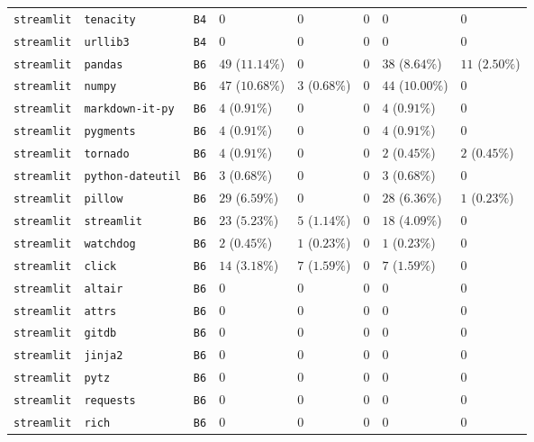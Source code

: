 \begin{table}
\begin{tabular}{llllllll}
\texttt{streamlit} & \texttt{tenacity} & \texttt{B4} & $0$ & $0$ & $0$ & $0$ & $0$ \\
\texttt{streamlit} & \texttt{urllib3} & \texttt{B4} & $0$ & $0$ & $0$ & $0$ & $0$ \\
\texttt{streamlit} & \texttt{pandas} & \texttt{B6} & $49$ ($11.14\%$) & $0$ & $0$ & $38$ ($8.64\%$) & $11$ ($2.50\%$) \\
\texttt{streamlit} & \texttt{numpy} & \texttt{B6} & $47$ ($10.68\%$) & $3$ ($0.68\%$) & $0$ & $44$ ($10.00\%$) & $0$ \\
\texttt{streamlit} & \texttt{markdown-it-py} & \texttt{B6} & $4$ ($0.91\%$) & $0$ & $0$ & $4$ ($0.91\%$) & $0$ \\
\texttt{streamlit} & \texttt{pygments} & \texttt{B6} & $4$ ($0.91\%$) & $0$ & $0$ & $4$ ($0.91\%$) & $0$ \\
\texttt{streamlit} & \texttt{tornado} & \texttt{B6} & $4$ ($0.91\%$) & $0$ & $0$ & $2$ ($0.45\%$) & $2$ ($0.45\%$) \\
\texttt{streamlit} & \texttt{python-dateutil} & \texttt{B6} & $3$ ($0.68\%$) & $0$ & $0$ & $3$ ($0.68\%$) & $0$ \\
\texttt{streamlit} & \texttt{pillow} & \texttt{B6} & $29$ ($6.59\%$) & $0$ & $0$ & $28$ ($6.36\%$) & $1$ ($0.23\%$) \\
\texttt{streamlit} & \texttt{streamlit} & \texttt{B6} & $23$ ($5.23\%$) & $5$ ($1.14\%$) & $0$ & $18$ ($4.09\%$) & $0$ \\
\texttt{streamlit} & \texttt{watchdog} & \texttt{B6} & $2$ ($0.45\%$) & $1$ ($0.23\%$) & $0$ & $1$ ($0.23\%$) & $0$ \\
\texttt{streamlit} & \texttt{click} & \texttt{B6} & $14$ ($3.18\%$) & $7$ ($1.59\%$) & $0$ & $7$ ($1.59\%$) & $0$ \\
\texttt{streamlit} & \texttt{altair} & \texttt{B6} & $0$ & $0$ & $0$ & $0$ & $0$ \\
\texttt{streamlit} & \texttt{attrs} & \texttt{B6} & $0$ & $0$ & $0$ & $0$ & $0$ \\
\texttt{streamlit} & \texttt{gitdb} & \texttt{B6} & $0$ & $0$ & $0$ & $0$ & $0$ \\
\texttt{streamlit} & \texttt{jinja2} & \texttt{B6} & $0$ & $0$ & $0$ & $0$ & $0$ \\
\texttt{streamlit} & \texttt{pytz} & \texttt{B6} & $0$ & $0$ & $0$ & $0$ & $0$ \\
\texttt{streamlit} & \texttt{requests} & \texttt{B6} & $0$ & $0$ & $0$ & $0$ & $0$ \\
\texttt{streamlit} & \texttt{rich} & \texttt{B6} & $0$ & $0$ & $0$ & $0$ & $0$ \\

\end{tabular}
\end{table}
